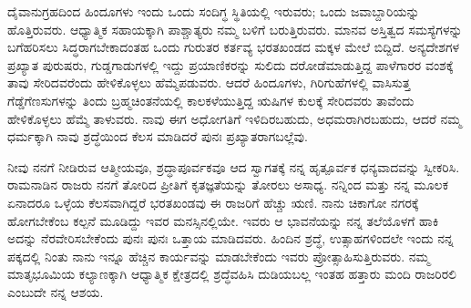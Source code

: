 ದೈವಾನುಗ್ರಹದಿಂದ ಹಿಂದೂಗಳು ಇಂದು ಒಂದು ಸಂದಿಗ್ಧ ಸ್ಥಿತಿಯಲ್ಲಿ ಇರುವರು; ಒಂದು ಜವಾಬ್ದಾರಿಯನ್ನು ಹೊತ್ತಿರುವರು. ಆಧ್ಯಾತ್ಮಿಕ ಸಹಾಯಕ್ಕಾಗಿ ಪಾಶ್ಚಾತ್ಯರು ನಮ್ಮ ಬಳಿಗೆ ಬರುತ್ತಿರುವರು. ಮಾನವ ಅಸ್ತಿತ್ವದ ಸಮಸ್ಯೆಗಳನ್ನು ಬಗೆಹರಿಸಲು ಸಿದ್ಧರಾಗಬೇಕಾದಂತಹ ಒಂದು ಗುರುತರ ಕರ್ತವ್ಯ ಭರತಖಂಡದ ಮಕ್ಕಳ ಮೇಲೆ ಬಿದ್ದಿದೆ. ಅನ್ಯದೇಶಗಳ ಪ್ರಖ್ಯಾತ ಪುರುಷರು, ಗುಡ್ಡಗಾಡುಗಳಲ್ಲಿ ಇದ್ದು ಪ್ರಯಾಣಿಕರನ್ನು ಸುಲಿದು ದರೋಡೆಮಾಡುತ್ತಿದ್ದ ಪಾಳೆಗಾರರ ವಂಶಕ್ಕೆ ತಾವು ಸೇರಿದವರೆಂದು ಹೇಳಿಕೊಳ್ಳಲು ಹೆಮ್ಮೆಪಡುವರು. ಆದರೆ ಹಿಂದೂಗಳು, ಗಿರಿಗುಹೆಗಳಲ್ಲಿ ವಾಸಿಸುತ್ತ ಗೆಡ್ಡೆಗೆಣಸುಗಳನ್ನು ತಿಂದು ಬ್ರಹ್ಮಚಿಂತನೆಯಲ್ಲಿ ಕಾಲಕಳೆಯುತ್ತಿದ್ದ ಋಷಿಗಳ ಕುಲಕ್ಕೆ ಸೇರಿದವರು ತಾವೆಂದು ಹೇಳಿಕೊಳ್ಳಲು ಹೆಮ್ಮೆ ತಾಳುವರು. ನಾವು ಈಗ ಅಧೋಗತಿಗೆ ಇಳಿದಿರಬಹುದು, ಅಧಮರಾಗಿರಬಹುದು, ಆದರೆ ನಮ್ಮ ಧರ್ಮಕ್ಕಾಗಿ ನಾವು ಶ್ರದ್ಧೆಯಿಂದ ಕೆಲಸ ಮಾಡಿದರೆ ಪುನಃ ಪ್ರಖ್ಯಾತರಾಗಬಲ್ಲೆವು.

ನೀವು ನನಗೆ ನೀಡಿರುವ ಆತ್ಮೀಯವೂ, ಶ್ರದ್ಧಾಪೂರ್ವಕವೂ ಆದ ಸ್ವಾಗತಕ್ಕೆ ನನ್ನ ಹೃತ್ಪೂರ್ವಕ ಧನ್ಯವಾದವನ್ನು ಸ್ವೀಕರಿಸಿ. ರಾಮನಾಡಿನ ರಾಜರು ನನಗೆ ತೋರಿದ ಪ್ರೀತಿಗೆ ಕೃತಜ್ಞತೆಯನ್ನು ತೋರಲು ಅಸಾಧ್ಯ. ನನ್ನಿಂದ ಮತ್ತು ನನ್ನ ಮೂಲಕ ಏನಾದರೂ ಒಳ್ಳೆಯ ಕೆಲಸವಾಗಿದ್ದರೆ ಭರತಖಂಡವು ಈ ರಾಜರಿಗೆ ಹೆಚ್ಚು ಋಣಿ. ನಾನು ಚಿಕಾಗೋ ನಗರಕ್ಕೆ\- ಹೋಗಬೇಕೆಂಬ ಕಲ್ಪನೆ ಮೂಡಿದ್ದು ಇವರ ಮನಸ್ಸಿನಲ್ಲಿಯೇ. ಇವರು ಆ ಭಾವನೆಯನ್ನು ನನ್ನ ತಲೆಯೊಳಗೆ ಹಾಕಿ ಅದನ್ನು ನೆರವೇರಿಸಬೇಕೆಂದು ಪುನಃ ಪುನಃ ಒತ್ತಾಯ ಮಾಡಿದವರು. ಹಿಂದಿನ ಶ್ರದ್ಧೆ, ಉತ್ಸಾಹಗಳಿಂದಲೇ ಇಂದು ನನ್ನ ಪಕ್ಕದಲ್ಲಿ ನಿಂತು ನಾನು ಇನ್ನೂ ಹೆಚ್ಚಿನ ಕಾರ್ಯವನ್ನು ಮಾಡಬೇಕೆಂದು ಇವರು ಪ್ರೋತ್ಸಾಹಿಸುತ್ತಿರುವರು. ನಮ್ಮ ಮಾತೃಭೂಮಿಯ ಕಲ್ಯಾಣಕ್ಕಾಗಿ ಆಧ್ಯಾತ್ಮಿಕ ಕ್ಷೇತ್ರದಲ್ಲಿ ಶ್ರದ್ಧೆವಹಿಸಿ ದುಡಿಯಬಲ್ಲ ಇಂತಹ ಹತ್ತಾರು ಮಂದಿ ರಾಜರಿರಲಿ ಎಂಬುದೇ ನನ್ನ ಆಶಯ.

